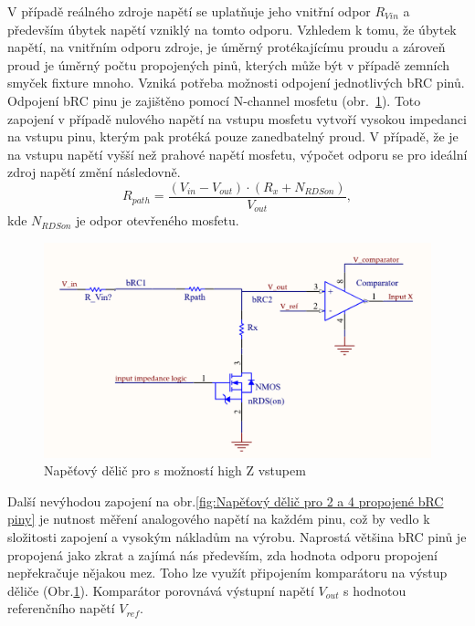     V případě reálného zdroje napětí se uplatňuje jeho vnitřní odpor $R_{Vin}$ a především úbytek napětí vzniklý na tomto odporu.
    Vzhledem k tomu, že úbytek napětí, na vnitřním odporu zdroje, je úměrný protékajícímu proudu a zároveň proud je úměrný počtu propojených pinů, kterých může být
    v případě zemních smyček fixture mnoho. Vzniká potřeba možnosti odpojení jednotlivých bRC pinů. Odpojení bRC pinu je zajištěno pomocí N-channel mosfetu
    \hbox{(obr. \ref{fig:Napěťový dělič pro s možností high Z vstupem}).}
    Toto zapojení v případě nulového napětí na vstupu mosfetu vytvoří vysokou impedanci na vstupu
    pinu, kterým pak protéká pouze zanedbatelný proud. V případě, že je na vstupu napětí vyšší než prahové napětí mosfetu, výpočet odporu se pro ideální zdroj napětí
    změní následovně.
    \begin{equation}
        R_{path} = \frac{(V_{in} - V_{out}) \cdot (R_x + N_{RDSon}) }{V_{out}},
    \end{equation}
     kde $N_{RDSon}$ je odpor otevřeného mosfetu.\\

\clearpage
    \begin{figure}[ht!]
        \centering
        \includegraphics[width = 1\textwidth]{obrazky/nMos_Connection.png}
        \caption{Napěťový dělič pro s možností high Z vstupem}
        \label{fig:Napěťový dělič pro s možností high Z vstupem}
\end{figure}

    Další nevýhodou zapojení na obr.\ref{fig:Napěťový dělič pro 2 a 4 propojené bRC piny}
    je nutnost měření analogového napětí na každém pinu, což by vedlo k
    složitosti zapojení a vysokým nákladům na výrobu. Naprostá většina bRC pinů je propojená jako zkrat a zajímá nás především,
    zda hodnota odporu propojení nepřekračuje nějakou mez.
    Toho lze využít připojením komparátoru na výstup děliče (Obr.\ref{fig:Napěťový dělič pro s možností high Z vstupem}).
    Komparátor porovnává výstupní napětí $V_{out}$ s hodnotou referenčního napětí $V_{ref}$.\\


